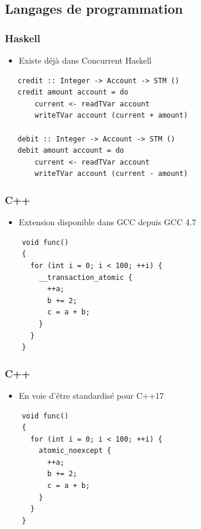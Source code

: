 \documentclass{beamer}
\begin{document}
\subsection{Langages de programmation}
\begin{frame}[fragile]
\frametitle{Haskell}
\begin{itemize}
\item Existe déjà dans Concurrent Haskell
\end{itemize}
\begin{lstlisting}
   credit :: Integer -> Account -> STM ()
   credit amount account = do
       current <- readTVar account
       writeTVar account (current + amount)
 
   debit :: Integer -> Account -> STM ()
   debit amount account = do
       current <- readTVar account
       writeTVar account (current - amount)
\end{lstlisting}
\end{frame}

\begin{frame}[fragile]
\frametitle{C++}
\begin{itemize}
\item Extension disponible dans GCC depuis GCC 4.7
\end{itemize}
\begin{lstlisting}
    void func()
    {
      for (int i = 0; i < 100; ++i) {
        __transaction_atomic {
          ++a;
          b += 2;
          c = a + b;
        }
      }
    }
\end{lstlisting}
\end{frame}

\begin{frame}[fragile]
\frametitle{C++}
\begin{itemize}
\item En voie d'être standardisé pour C++17
\end{itemize}
\begin{lstlisting}
    void func()
    {
      for (int i = 0; i < 100; ++i) {
        atomic_noexcept {
          ++a;
          b += 2;
          c = a + b;
        }
      }
    }
\end{lstlisting}
\end{frame}
\end{document}
